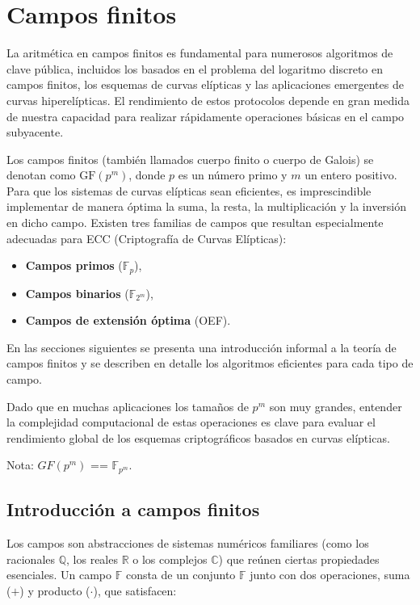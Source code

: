 \chapter{Campos finitos}
La aritmética en campos finitos es fundamental para numerosos algoritmos de clave pública, incluidos los basados en el problema del logaritmo discreto en campos finitos, los esquemas de curvas elípticas y las aplicaciones emergentes de curvas hiperelípticas. El rendimiento de estos protocolos depende en gran medida de nuestra capacidad para realizar rápidamente operaciones básicas en el campo subyacente.  

Los campos finitos (también llamados cuerpo finito o cuerpo de Galois) se denotan como \(\mathrm{GF}(p^m)\), donde \(p\) es un número primo y \(m\) un entero positivo. Para que los sistemas de curvas elípticas sean eficientes, es imprescindible implementar de manera óptima la suma, la resta, la multiplicación y la inversión en dicho campo. Existen tres familias de campos que resultan especialmente adecuadas para ECC (Criptografía de Curvas Elípticas):  
\begin{itemize}
  \item \textbf{Campos primos} (\(\mathbb{F}_p\)),  
  \item \textbf{Campos binarios} (\(\mathbb{F}_{2^m}\)),  
  \item \textbf{Campos de extensión óptima} (OEF).  
\end{itemize}
En las secciones siguientes se presenta una introducción informal a la teoría de campos finitos y se describen en detalle los algoritmos eficientes para cada tipo de campo.  

Dado que en muchas aplicaciones los tamaños de \(p^m\) son muy grandes, entender la complejidad computacional de estas operaciones es clave para evaluar el rendimiento global de los esquemas criptográficos basados en curvas elípticas.  

Nota: $GF(p^m)$ == \(\mathbb{F}_{p^m}\).

\section{Introducción a campos finitos}
Los campos son abstracciones de sistemas numéricos familiares (como los racionales \(\mathbb{Q}\), los reales \(\mathbb{R}\) o los complejos \(\mathbb{C}\)) que reúnen ciertas propiedades esenciales. Un campo \(\mathbb{F}\) consta de un conjunto \(\mathbb{F}\) junto con dos operaciones, suma (\(+\)) y producto (\(\cdot\)), que satisfacen:

